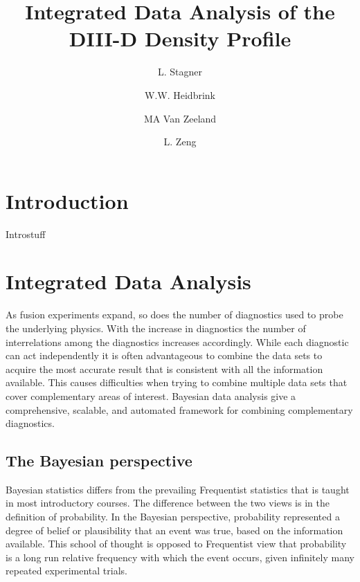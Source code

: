 \documentclass[12pt]{article}
\numberwithin{equation}{section}
\begin{document}
\title{\bf{Integrated Data Analysis of the DIII-D Density Profile}}
\author[1]{L. Stagner}
\author[1]{W.W. Heidbrink}
\author[2]{MA Van Zeeland}
\author[2]{L. Zeng}
\date{}
\maketitle
\begin{abstract}
\end{abstract}
\section{Introduction}
Introstuff

\section{Integrated Data Analysis}
As fusion experiments expand, so does the number of diagnostics used to 
probe the underlying physics. With the increase in diagnostics the 
number of interrelations among the diagnostics increases accordingly. 
While each diagnostic can act independently it is often advantageous to 
combine the data sets to acquire the most accurate result that is 
consistent with all the information available. This causes difficulties 
when trying to combine multiple data sets that cover complementary 
areas of interest. Bayesian data analysis give a comprehensive, 
scalable, and automated framework for combining complementary 
diagnostics.    
\subsection{The Bayesian perspective}
Bayesian statistics differs from the prevailing Frequentist statistics 
that is taught in most introductory courses. The difference between the 
two views is in the definition of probability. In the Bayesian 
perspective, probability represented a degree of belief or plausibility 
that an event was true, based on the information available. This school 
of thought is opposed to Frequentist view that probability is a long 
run relative frequency with which the event occurs, given infinitely 
many repeated experimental trials.\cite{von2011bayesian}
\end{document}
